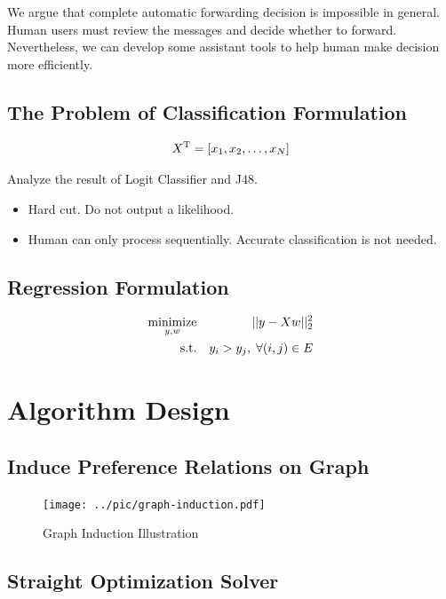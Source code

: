 \documentclass{sig-alternate}
\begin{document}
We argue that complete automatic forwarding decision is impossible in general. 
Human users must review the messages and decide whether to forward. 
Nevertheless, we can develop some assistant tools to 
help human make decision more efficiently. 


\subsection{The Problem of Classification Formulation}
\label{sec:The Problem of Classification}

\begin{equation}
	X^\mathrm{T} = [x_1, x_2, \ldots, x_N]
\end{equation}

Analyze the result of Logit Classifier and J48. 

\begin{itemize}
	\item 
	Hard cut. Do not output a likelihood.
	\item 
	Human can only process sequentially. 
	Accurate classification is not needed.
\end{itemize}

\subsection{Regression Formulation}
\label{sec:Regression Formulation}

\begin{eqnarray}
	\operatorname*{minimize}_{y,w} && ||y - Xw||_2^2 \\
	\text{s.t.} && y_i > y_j, \; \forall (i,j) \in E
\end{eqnarray}

\section{Algorithm Design}
\label{sec:Algorithm Design}

\subsection{Induce Preference Relations on Graph}
\label{sec:Induce Preference Relations on Graph}

\begin{figure}[t!]
	\centering
	\texttt{[image: ../pic/graph-induction.pdf]}
	\caption{Graph Induction Illustration}
\end{figure}

\subsection{Straight Optimization Solver}
\label{sec:Straight Optimization Solver}
\end{document}
